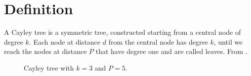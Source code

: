 \section{Definition}

    A Cayley tree is a symmetric tree, constructed starting from a central node of degree $k$. Each node at distance $d$ from the central node has degree $k$, until we reach the nodes at distance $P$ that have degree one and are called leaves. From \cite{barabasi}.

    \begin{figure}[H]
        \centering
        

        \caption{Cayley tree with $k = 3$ and $P = 5$.}
        \label{fig:caley-tree}
    \end{figure}
